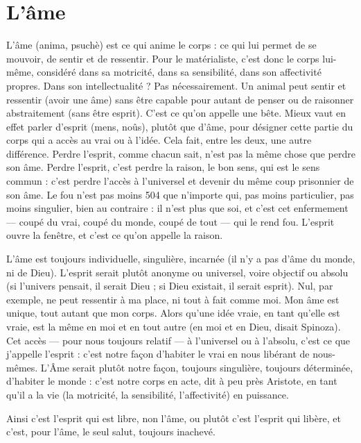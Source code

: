 
\section{L'âme}
L'âme {\it }(anima, psuchè) est ce qui anime le corps : ce qui lui permet de se
mouvoir, de sentir et de ressentir. Pour le matérialiste, c’est donc le
corps lui-même, considéré dans sa motricité, dans sa sensibilité, dans son affectivité
propres. Dans son intellectualité ? Pas nécessairement. Un animal peut
sentir et ressentir (avoir une âme) sans être capable pour autant de penser ou de
raisonner abstraitement (sans être esprit). C’est ce qu’on appelle une bête.
Mieux vaut en effet parler d’esprit {\it }(mens, noûs), plutôt que d’âme, pour désigner
cette partie du corps qui a accès au vrai ou à l’idée. Cela fait, entre les
deux, une autre différence. Perdre l'esprit, comme chacun sait, n’est pas la
même chose que perdre son âme. Perdre l'esprit, c’est perdre la raison, le bon
sens, qui est le sens commun : c’est perdre l’accès à l’universel et devenir du
même coup prisonnier de son âme. Le fou n’est pas moins 504 que n'importe
qui, pas moins particulier, pas moins singulier, bien au contraire : il n’est plus
que soi, et c’est cet enfermement — coupé du vrai, coupé du monde, coupé de
tout — qui le rend fou. L'esprit ouvre la fenêtre, et c’est ce qu’on appelle la
raison.

L'âme est toujours individuelle, singulière, incarnée (il n’y a pas d’âme du
monde, ni de Dieu). L’esprit serait plutôt anonyme ou universel, voire objectif
ou absolu (si l’univers pensait, il serait Dieu ; si Dieu existait, il serait esprit).
Nul, par exemple, ne peut ressentir à ma place, ni tout à fait comme moi. Mon
âme est unique, tout autant que mon corps. Alors qu’une idée vraie, en tant
qu’elle est vraie, est la même en moi et en tout autre (en moi et en Dieu, disait
Spinoza). Cet accès — pour nous toujours relatif — à l’universel ou à l'absolu,
c'est ce que j'appelle l'esprit : c’est notre façon d’habiter le vrai en nous libérant
de nous-mêmes. L’Âme serait plutôt notre façon, toujours singulière, toujours
déterminée, d’habiter le monde : c’est notre corps en acte, dit à peu près Aristote,
en tant qu'il a la vie (la motricité, la sensibilité, l’affectivité) en puissance.

Ainsi c’est l'esprit qui est libre, non l’âme, ou plutôt c’est l'esprit qui libère,
et c’est, pour l’âme, le seul salut, toujours inachevé.

